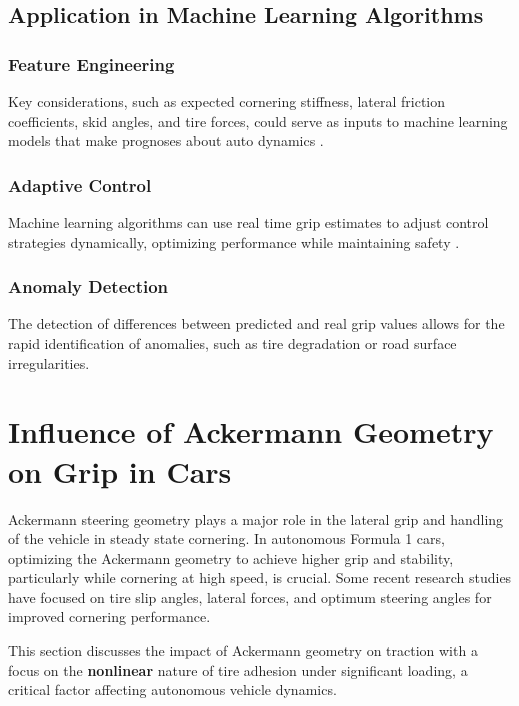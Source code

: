 \documentclass[a4paper,final,12pt]{report}
\begin{document}
\subsection{Application in Machine Learning Algorithms}
\subsubsection{Feature Engineering}
Key considerations, such as expected cornering stiffness, lateral friction coefficients, skid angles, and tire forces, could serve as inputs to machine learning models that make prognoses about auto dynamics \cite{Savarese2017}.

\subsubsection{Adaptive Control}
Machine learning algorithms can use real time grip estimates to adjust control strategies dynamically, optimizing performance while maintaining safety \cite{Hwang2018}.

\subsubsection{Anomaly Detection}
The detection of differences between predicted and real grip values allows for the rapid identification of anomalies, such as tire degradation or road surface irregularities\cite{Bascetta2021}.

\section{Influence of Ackermann Geometry on Grip in Cars}
Ackermann steering geometry plays a major role in the lateral grip and handling of the vehicle in steady state cornering. In autonomous Formula 1 cars, optimizing the Ackermann geometry to achieve higher grip and stability, particularly while cornering at high speed, is crucial. Some recent research studies have focused on tire slip angles, lateral forces, and optimum steering angles for improved cornering performance\cite{Jambukolam2022}.

This section discusses the impact of Ackermann geometry on traction with a focus on the \textbf{nonlinear} nature of tire adhesion under significant loading, a critical factor affecting autonomous vehicle dynamics.
\end{document}
